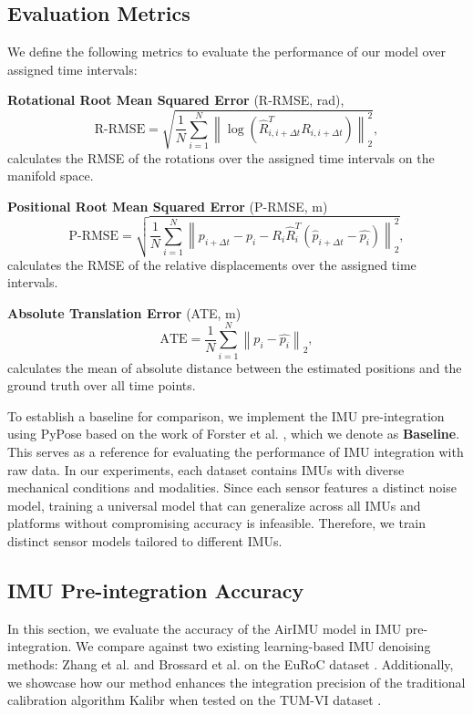 \subsection{Evaluation Metrics}

We define the following metrics to evaluate the performance of our model over assigned time intervals:

\textbf{Rotational Root Mean Squared Error} (R-RMSE, \si{\radian}),
\begin{equation}
     \text{R-RMSE} = \sqrt{\frac{1}{N} \sum^N_{i=1}\left\| \log\left(\hat{R}_{i,i+\Delta t}^T R_{i,i+\Delta t}\right)\right\|^2_2},
\end{equation}
calculates the RMSE of the rotations over the assigned time intervals on the manifold space.

\textbf{Positional Root Mean Squared Error} (P-RMSE, \si{\meter})
\begin{equation}
    \text{P-RMSE} =\sqrt{ \frac{1}{N}\sum^N_{i=1}\left\| p_{i+\Delta t} - p_{i} - R_{i}\hat{R}_{i}^T \left(\hat{p}_{i+\Delta t} - \hat{p_{i}}\right)\right\|^2_2},
\end{equation}
calculates the RMSE of the relative displacements over the assigned time intervals.

\textbf{Absolute Translation Error} (ATE, \si{\meter})
\begin{equation}
    \text{ATE} = \frac{1}{N}\sum^N_{i=1}{\left\| p_{i} - \hat{p_{i}}\right\|_2},
\end{equation}
calculates the mean of absolute distance between the estimated positions and the ground truth over all time points.

To establish a baseline for comparison, we implement the IMU pre-integration using PyPose \cite{wang2023pypose} based on the work of Forster et al. \cite{forster2015imu}, which we denote as \textbf{Baseline}. 
This serves as a reference for evaluating the performance of IMU integration with raw data.
In our experiments, each dataset contains IMUs with diverse mechanical conditions and modalities. Since each sensor features a distinct noise model, training a universal model that can generalize across all IMUs and platforms without compromising accuracy is infeasible. 
Therefore, we train distinct sensor models tailored to different IMUs.


\subsection{IMU Pre-integration Accuracy}\label{Exp: Denoising}
In this section, we evaluate the accuracy of the AirIMU model in IMU pre-integration.
We compare against two existing learning-based IMU denoising methods: Zhang et al. \cite{zhang2021imu} and Brossard et al. \cite{brossard2020denoising} on the EuRoC dataset \cite{burri2016euroc}. 
Additionally, we showcase how our method enhances the integration precision of the traditional calibration algorithm Kalibr \cite{rehder2016extending} when tested on the TUM-VI dataset \cite{schubert2018tum}.

